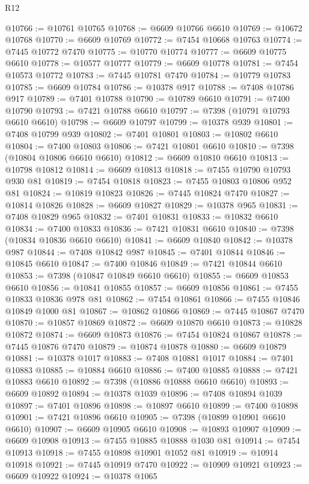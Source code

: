 \begin{lexlean}{R12}
\begin{coremodule}
@10766 := @10761 @10765
@10768 := @6609 @10766 @6610
@10769 := @10672 @10768
@10770 := @6609 @10769
@10772 := @7454 @10668 @10763
@10774 := @7445 @10772 @7470
@10775 := @10770 @10774
@10777 := @6609 @10775 @6610
@10778 := @10577 @10777
@10779 := @6609 @10778
@10781 := @7454 @10573 @10772
@10783 := @7445 @10781 @7470
@10784 := @10779 @10783
@10785 := @6609 @10784
@10786 := @10378 @917
@10788 := @7408 @10786 @917
@10789 := @7401 @10788
@10790 := @10789 @6610
@10791 := @7400 @10790
@10793 := @7421 @10788 @6610
@10797 := @7398 (@10791 @10793 @6610 @6610)
@10798 := @6609 @10797
@10799 := @10378 @939
@10801 := @7408 @10799 @939
@10802 := @7401 @10801
@10803 := @10802 @6610
@10804 := @7400 @10803
@10806 := @7421 @10801 @6610
@10810 := @7398 (@10804 @10806 @6610 @6610)
@10812 := @6609 @10810 @6610
@10813 := @10798 @10812
@10814 := @6609 @10813
@10818 := @7455 @10790 @10793 @930 @81
@10819 := @7454 @10818
@10823 := @7455 @10803 @10806 @952 @81
@10824 := @10819 @10823
@10826 := @7445 @10824 @7470
@10827 := @10814 @10826
@10828 := @6609 @10827
@10829 := @10378 @965
@10831 := @7408 @10829 @965
@10832 := @7401 @10831
@10833 := @10832 @6610
@10834 := @7400 @10833
@10836 := @7421 @10831 @6610
@10840 := @7398 (@10834 @10836 @6610 @6610)
@10841 := @6609 @10840
@10842 := @10378 @987
@10844 := @7408 @10842 @987
@10845 := @7401 @10844
@10846 := @10845 @6610
@10847 := @7400 @10846
@10849 := @7421 @10844 @6610
@10853 := @7398 (@10847 @10849 @6610 @6610)
@10855 := @6609 @10853 @6610
@10856 := @10841 @10855
@10857 := @6609 @10856
@10861 := @7455 @10833 @10836 @978 @81
@10862 := @7454 @10861
@10866 := @7455 @10846 @10849 @1000 @81
@10867 := @10862 @10866
@10869 := @7445 @10867 @7470
@10870 := @10857 @10869
@10872 := @6609 @10870 @6610
@10873 := @10828 @10872
@10874 := @6609 @10873
@10876 := @7454 @10824 @10867
@10878 := @7445 @10876 @7470
@10879 := @10874 @10878
@10880 := @6609 @10879
@10881 := @10378 @1017
@10883 := @7408 @10881 @1017
@10884 := @7401 @10883
@10885 := @10884 @6610
@10886 := @7400 @10885
@10888 := @7421 @10883 @6610
@10892 := @7398 (@10886 @10888 @6610 @6610)
@10893 := @6609 @10892
@10894 := @10378 @1039
@10896 := @7408 @10894 @1039
@10897 := @7401 @10896
@10898 := @10897 @6610
@10899 := @7400 @10898
@10901 := @7421 @10896 @6610
@10905 := @7398 (@10899 @10901 @6610 @6610)
@10907 := @6609 @10905 @6610
@10908 := @10893 @10907
@10909 := @6609 @10908
@10913 := @7455 @10885 @10888 @1030 @81
@10914 := @7454 @10913
@10918 := @7455 @10898 @10901 @1052 @81
@10919 := @10914 @10918
@10921 := @7445 @10919 @7470
@10922 := @10909 @10921
@10923 := @6609 @10922
@10924 := @10378 @1065

\end{coremodule}
\end{lexlean}
